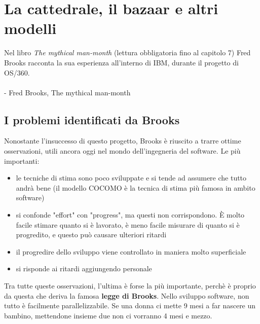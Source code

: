 \section{La cattedrale, il bazaar e altri modelli}
Nel libro \textit{The mythical man-month} (lettura obbligatoria fino al capitolo 7) Fred Brooks racconta la sua esperienza all'interno di IBM, durante il progetto di OS/360.\\\\
 \cite{manmonth} - Fred Brooks, The mythical man-month
\subsection{I problemi identificati da Brooks}
Nonostante l'insuccesso di questo progetto, Brooks è riuscito a trarre ottime osservazioni, utili ancora oggi nel mondo dell'ingegneria del software. Le più importanti:
\begin{itemize}
    \item le tecniche di stima sono poco sviluppate e si tende ad assumere che tutto andrà bene (il modello COCOMO è la tecnica di stima più famosa in ambito software)
    \item si confonde "effort" con "progress", ma questi non corrispondono. È molto facile stimare quanto si è lavorato, è meno facile misurare di quanto si è progredito, e questo può causare ulteriori ritardi
    \item il progredire dello sviluppo viene controllato in maniera molto superficiale
    \item si risponde ai ritardi aggiungendo personale
\end{itemize}

\noindent Tra tutte queste osservazioni, l'ultima è forse la più importante, perchè è proprio da questa che deriva la famosa \textbf{legge di Brooks}. Nello sviluppo software, non tutto è facilmente parallelizzabile. Se una donna ci mette 9 mesi a far nascere un bambino, mettendone insieme due non ci vorranno 4 mesi e mezzo.

